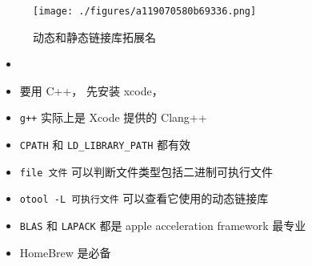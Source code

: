 
\begin{issues}
\issueDraft
\end{issues}

\begin{figure}[ht]
\centering
\texttt{[image: ./figures/a119070580b69336.png]}
\caption{动态和静态链接库拓展名} \label{fig_MacDev_1}
\end{figure}

\begin{itemize}
\item 
\item 要用 C++， 先安装 xcode， \item \verb`g++` 实际上是 Xcode 提供的 Clang++
\item \verb`CPATH` 和 \verb`LD_LIBRARY_PATH` 都有效
\item \verb`file 文件` 可以判断文件类型包括二进制可执行文件
\item \verb`otool -L 可执行文件` 可以查看它使用的动态链接库
\item \verb`BLAS` 和 \verb`LAPACK` 都是 apple acceleration framework 最专业
\item HomeBrew 是必备
\end{itemize}

